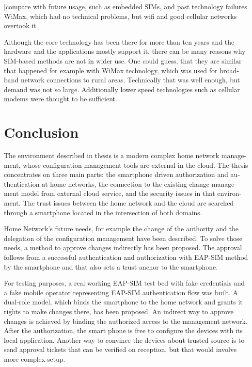 \documentclass[12pt,a4paper,english]{tutthesis}
\begin{document}
\begin{otherlanguage}{english}
[compare with future usage, such as embedded SIMs, and past technology 
failures WiMax, which had no technical problems, but wifi and good
cellular networks overtook it.]

Although the core technology has been there for more than ten years and
the hardware and the applications mostly support it, 
there can be many reasons why SIM-based methods are not in wider use. 
One could guess, that they are similar that happened for example with 
WiMax technology, which was used for broadband network connections to
rural areas. Technically that was well enough, but demand was not so
large. Additionally lower speed technologies such as cellular modems
were thought to be sufficient.


\chapter{Conclusion}
\label{sec-7}



The environment described in thesis is a modern complex home network
management, whose configuration management tools are external in the
cloud.  The thesis concentrates on three main parts:
the smartphone driven authorization and authentication at home
networks, the connection to the existing change management model from
external cloud service, and the security issues in that environment.
The trust issues between the home network and the cloud are searched
through a smartphone located in the intersection of both domains.

Home Network's future needs, for example the change of the authority
and the delegation of the configuration management have been
described.
To solve those needs, a method to approve changes indirectly has been
proposed. The approval follows from a successful authentication and
authorization with EAP-SIM method by the smartphone and that also sets
a trust anchor to the smartphone.


For testing purposes, a real working EAP-SIM test bed with fake credentials and
a fake mobile operator representing EAP-SIM authentication flow was
built. A dual-role model, which binds the smartphone to the home network and
grants it rights to make changes there, has been proposed.  
An indirect way to approve changes is achieved by binding the authorized
access to the management network. After the authorization, the smart
phone is free to configure the devices with its local application.
Another way to convince the
devices about trusted source is to send approval tickets that can
be verified on reception, but that would involve more complex setup.


\end{otherlanguage}
\end{document}
